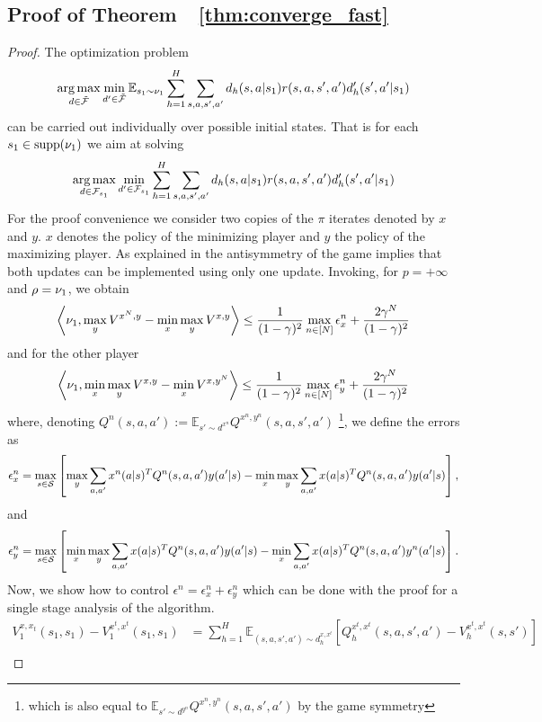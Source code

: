 \subsection{Proof of Theorem~~\ref{thm:converge_fast}}
\label{proof:converge_fast}
\begin{proof}
The optimization problem
$$
\operatorname*{arg\,max}_{d\in\tilde{\mathcal{F}}} \min_{d'\in\tilde{\mathcal{F}}} \mathbb{E}_{s_1 \sim \nu_1}\sum^H_{h=1}\sum_{s,a,s',a'} d_h(s,a | s_1) r(s,a,s',a') d_h'(s',a'|s_1)
$$
can be carried out individually over possible initial states. That is for each $s_1 \in \mathrm{supp}(\nu_1)$ we aim at solving
$$
\operatorname*{arg\,max}_{d\in\mathcal{F}_{s_1}} \min_{d'\in\mathcal{F}_{s_1}} \sum^H_{h=1}\sum_{s,a,s',a'} d_h(s,a | s_1) r(s,a,s',a') d_h'(s',a'|s_1)
$$
For the proof convenience we consider two copies of the $\pi$ iterates denoted by $x$ and $y$. $x$ denotes the policy of the minimizing player and $y$ the policy of the maximizing player. As explained in \cite{swamyminimaximalist} the antisymmetry of the game implies that both updates can be implemented using only one update.
Invoking, \cite[Theorem 1]{perolat2015approximate} for $p = + \infty$ and $\rho = \nu_1$, we obtain
\begin{align*}
\left\langle{\nu_1},{\max_{y} V^{x^N,y} - \min_x \max_y V^{x,y}}\right\rangle \leq \frac{1}{(1 - \gamma)^2} \max_{n \in [N]} \epsilon_x^n + \frac{2 \gamma^N}{(1 - \gamma)^2}
\end{align*}
and for the other player
\begin{align*}
\left\langle{\nu_1},{\min_x \max_y V^{x,y} - \min_{x} V^{x,y^N} }\right\rangle \leq \frac{1}{(1 - \gamma)^2} \max_{n \in [N]} \epsilon_y^n + \frac{2 \gamma^N}{(1 - \gamma)^2}
\end{align*}
where, denoting $Q^n(s,a,a') := \mathbb{E}_{s' \sim d^{x^n}} Q^{x^n,y^n}(s,a,s',a') $ \footnote{which is also equal to $\mathbb{E}_{s' \sim d^{y^n}} Q^{x^n,y^n}(s,a,s',a')$ by the game symmetry}, we define the errors as $$\epsilon_x^n = \max_{s\in \mathcal{S}} \left[{\max_ y \sum_{a,a'} x^n(a|s)^T Q^n(s, a, a') y(a'|s) - \min_x \max_ y \sum_{a,a'} x(a|s)^T Q^n(s, a, a') y(a'|s)}\right], $$
and
$$\epsilon_y^n = \max_{s\in \mathcal{S}} \left[{\min_x \max_ y \sum_{a,a'} x(a|s)^T Q^n(s, a, a') y(a'|s) - \min_x \sum_{a,a'} x(a|s)^T Q^n(s, a, a') y^n(a'|s)}\right]. $$
Now, we show how to control $\epsilon^n = \epsilon^n_x + \epsilon^n_y$ which can be done with the proof for a single stage analysis of the \oomdmethod{} algorithm.
\begin{align*}
V_1^{x,x_t}(s_1,s_1) - V_1^{x^t,x^t}(s_1,s_1) &= \sum^H_{h=1}\mathbb{E}_{(s, a, s', a') \sim d^{x, x^t}_h}\left[ Q_h^{x^t,x^t}(s,a,s',a') - V_h^{x^t,x^t}(s,s')\right] \\

\end{align*}
\end{proof}

